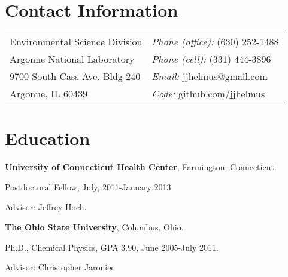 \documentclass[margin,line]{res}
\newenvironment{list1}{
  \begin{list}{\ding{113}}{%
      \setlength{\itemsep}{0in}
      \setlength{\parsep}{0in} \setlength{\parskip}{0in}
      \setlength{\topsep}{0in} \setlength{\partopsep}{0in}
      \setlength{\leftmargin}{0.17in}}}{\end{list}}
\begin{document}

\begin{resume}
\section{\sc Contact Information}



\begin{tabular}{@{}p{2in}p{4in}}
Environmental Science Division  & {\it Phone (office):}  (630) 252-1488 \\
Argonne National Laboratory     & {\it Phone (cell):}  (331) 444-3896\\
9700 South Cass Ave. Bldg 240   & {\it Email:} jjhelmus@gmail.com\\
Argonne, IL 60439               & {\it Code:} github.com/jjhelmus\\
\end{tabular}


\section{\sc Education}

{\bf University of Connecticut Health Center}, Farmington, Connecticut.
\begin{list1}
\item[] Postdoctoral Fellow, July, 2011-January 2013.
\item[] Advisor: Jeffrey Hoch.
\end{list1}
\vspace{-0.1in}


{\bf The Ohio State University}, Columbus, Ohio.
\begin{list1}
\item[] Ph.D., Chemical Physics, GPA 3.90, June 2005-July 2011.
\item[] Advisor:  Christopher Jaroniec
\end{list1}
\vspace{-0.1in}


\end{resume}
\end{document}
